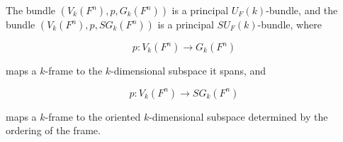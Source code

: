 The bundle $(V_k(F^n), p, G_k(F^n))$ is a principal $U_F(k)$-bundle, and the bundle $(V_k(F^n), p, SG_k(F^n))$ is a principal $SU_F(k)$-bundle, where

$$p: V_k(F^n) \rightarrow G_k(F^n)$$

maps a $k$-frame to the $k$-dimensional subspace it spans, and

$$p: V_k(F^n) \rightarrow SG_k(F^n)$$

maps a $k$-frame to the oriented $k$-dimensional subspace determined by the ordering of the frame.
